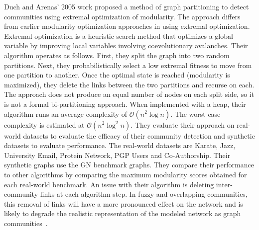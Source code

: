  \par{Duch and Arenas' 2005 work proposed a method of graph partitioning to detect communities using extremal optimization of modularity. 
 The approach differs from earlier modularity optimization approaches in using extremal optimization. 
 Extremal optimization is a heuristic search method that optimizes a global variable by improving local variables involving coevolutionary avalanches. 
 Their algorithm operates as follows. 
 First, they split the graph into two random partitions. 
 Next, they probabilistically select a low extremal fitness to move from one partition to another. 
 Once the optimal state is reached (modularity is maximized), they delete the links between the two partitions and recurse on each. 
 The approach does not produce an equal number of nodes on each split side, so it is not a formal bi-partitioning approach. 
 When implemented with a heap, their algorithm runs an average complexity of $\mathcal{O}(n^2\log{n})$. The worst-case complexity is estimated at $\mathcal{O}(n^2\log^2{n})$. 
 They evaluate their approach on real-world datasets to evaluate the efficacy of their community detection and synthetic datasets to evaluate performance. 
 The real-world datasets are Karate, Jazz, University Email, Protein Network, PGP Users and Co-Authorship. Their synthetic graphs use the GN benchmark graphs. 
 They compare their performance to other algorithms by comparing the maximum modularity scores obtained for each real-world benchmark. 
 An issue with their algorithm is deleting inter-community links at each algorithm step. 
 In fuzzy and overlapping communities, this removal of links will have a more pronounced effect on the network and is likely to degrade the realistic representation of the modeled network as graph communities~\cite{Duch2005}.}

